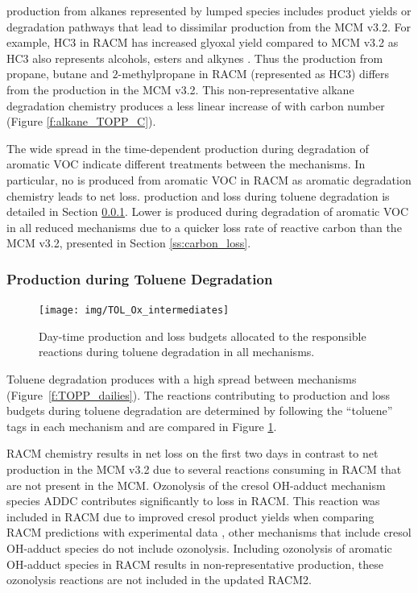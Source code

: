  production from alkanes represented by lumped species includes product yields or degradation pathways that lead to dissimilar  production from the MCM v3.2.
For example, HC3 in RACM has increased glyoxal yield compared to MCM v3.2 as HC3 also represents alcohols, esters and alkynes \citep{Stockwell:1997}.
Thus the  production from propane, butane and $2$-methylpropane in RACM (represented as HC3) differs from the  production in the MCM v3.2.
This non-representative alkane degradation chemistry produces a less linear increase of  with carbon number (Figure \ref{f:alkane_TOPP_C}).

The wide spread in the time-dependent  production during degradation of aromatic VOC indicate different treatments between the mechanisms.
In particular, no  is produced from aromatic VOC in RACM as aromatic degradation chemistry leads to net  loss.
 production and loss during toluene degradation is detailed in Section \ref{sss:aromatic}.
Lower  is produced during degradation of aromatic VOC in all reduced mechanisms due to a quicker loss rate of reactive carbon than the MCM v3.2, presented in Section \ref{ss:carbon_loss}.

\subsubsection[Ox Production during Toluene Degradation]{ Production during Toluene Degradation} \label{sss:aromatic}

\begin{figure}
    \centering
    \texttt{[image: img/TOL\_Ox\_intermediates]}
    \vspace{0mm}
    \caption{Day-time  production and loss budgets allocated to the responsible reactions during toluene degradation in all mechanisms.}
    \vspace{-4mm}
    \label{f:toluene_Ox}
\end{figure}

Toluene degradation produces  with a high spread between mechanisms (\mbox{Figure \ref{f:TOPP_dailies}}).
The reactions contributing to  production and loss budgets during toluene degradation are determined by following the ``toluene'' tags in each mechanism and are compared in Figure \ref{f:toluene_Ox}.

RACM chemistry results in net  loss on the first two days in contrast to net  production in the MCM v3.2 due to several reactions consuming  in RACM that are not present in the MCM.
Ozonolysis of the cresol OH-adduct mechanism species ADDC contributes significantly to  loss in RACM.
This reaction was included in RACM due to improved cresol product yields when comparing RACM predictions with experimental data \citep{Stockwell:1997}, other mechanisms that include cresol OH-adduct species do not include ozonolysis.
Including ozonolysis of aromatic OH-adduct species in RACM results in non-representative  production, these ozonolysis reactions are not included in the updated RACM2.

